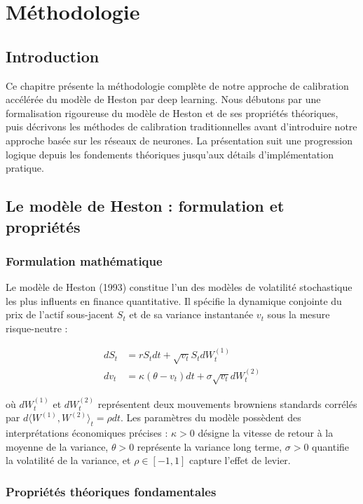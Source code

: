 \chapter{Méthodologie}

\section{Introduction}

Ce chapitre présente la méthodologie complète de notre approche de calibration accélérée du modèle de Heston par deep learning. Nous débutons par une formalisation rigoureuse du modèle de Heston et de ses propriétés théoriques, puis décrivons les méthodes de calibration traditionnelles avant d'introduire notre approche basée sur les réseaux de neurones. La présentation suit une progression logique depuis les fondements théoriques jusqu'aux détails d'implémentation pratique.

\section{Le modèle de Heston : formulation et propriétés}

\subsection{Formulation mathématique}

Le modèle de Heston (1993) constitue l'un des modèles de volatilité stochastique les plus influents en finance quantitative. Il spécifie la dynamique conjointe du prix de l'actif sous-jacent $S_t$ et de sa variance instantanée $v_t$ sous la mesure risque-neutre :

\begin{align}
dS_t &= rS_t dt + \sqrt{v_t}S_t dW_t^{(1)} \label{eq:heston_price}\\
dv_t &= \kappa(\theta - v_t)dt + \sigma\sqrt{v_t}dW_t^{(2)} \label{eq:heston_variance}
\end{align}

où $dW_t^{(1)}$ et $dW_t^{(2)}$ représentent deux mouvements browniens standards corrélés par $d\langle W^{(1)}, W^{(2)} \rangle_t = \rho dt$. Les paramètres du modèle possèdent des interprétations économiques précises : $\kappa > 0$ désigne la vitesse de retour à la moyenne de la variance, $\theta > 0$ représente la variance long terme, $\sigma > 0$ quantifie la volatilité de la variance, et $\rho \in [-1,1]$ capture l'effet de levier.

\subsection{Propriétés théoriques fondamentales}

